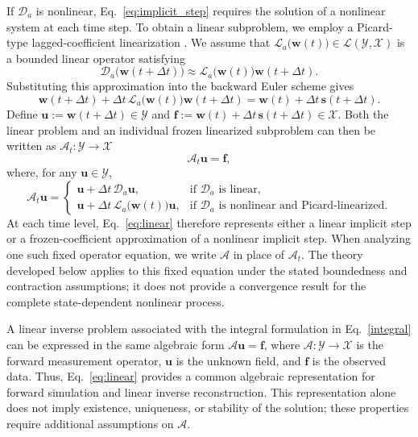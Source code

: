 \documentclass[preprint,numbers,sort&compress]{elsarticle}
\begin{document}
		If $\mathcal D_a$ is nonlinear, Eq.~\eqref{eq:implicit_step} requires the
		solution of a nonlinear system at each time step. To obtain a linear
		subproblem, we employ a Picard-type lagged-coefficient linearization
		\cite{deblois1997linearizing}. We assume that
		$\mathcal L_a\bigl(\boldsymbol w(t)\bigr)
		\in \mathcal L(\mathcal Y,\mathcal X)$ is a bounded linear operator satisfying
		\[
		\mathcal D_a\bigl(\boldsymbol w(t+\Delta t)\bigr)
		\approx
		\mathcal L_a\bigl(\boldsymbol w(t)\bigr)
		\boldsymbol w(t+\Delta t).
		\]
		Substituting this approximation into the backward Euler scheme gives
		\[
		\boldsymbol w(t+\Delta t)
		+
		\Delta t\,
		\mathcal L_a\bigl(\boldsymbol w(t)\bigr)
		\boldsymbol w(t+\Delta t)
		=
		\boldsymbol w(t)
		+
		\Delta t\,\boldsymbol s(t+\Delta t).
		\]
		Define $\boldsymbol u:=
		\boldsymbol w(t+\Delta t)\in\mathcal Y$ and $\boldsymbol f
		:=\boldsymbol w(t)+\Delta t\,\boldsymbol s(t+\Delta t)
		\in\mathcal X$. Both the linear problem and an individual frozen linearized subproblem can then be written as $\mathcal A_t:\mathcal Y\to\mathcal X$
		\begin{equation}
			\label{eq:linear}
			\mathcal A_t\boldsymbol u=\boldsymbol f,
		\end{equation}
		where, for any $\boldsymbol u\in\mathcal Y$,
		\begin{equation}
			\mathcal A_t\boldsymbol u
			=
			\begin{cases}
				\boldsymbol u+\Delta t\,\mathcal D_a\boldsymbol u,
				&
				\text{if $\mathcal D_a$ is linear},
				\\[1mm]
				\boldsymbol u
				+
				\Delta t\,
				\mathcal L_a\bigl(\boldsymbol w(t)\bigr)\boldsymbol u,
				&
				\text{if $\mathcal D_a$ is nonlinear and Picard-linearized}.
			\end{cases}
		\end{equation}
		At each time level, Eq.~\eqref{eq:linear} therefore represents either a linear implicit step or a frozen-coefficient approximation of a nonlinear implicit step. When analyzing one such fixed operator equation, we write $\mathcal A$ in place of $\mathcal A_t$. The theory developed below applies to this fixed equation under the stated boundedness and contraction
		assumptions; it does not provide a convergence result for the complete state-dependent nonlinear process.
		
		A linear inverse problem associated with the integral formulation in Eq.~\eqref{integral} can be expressed in the same algebraic form $\mathcal A\boldsymbol u=\boldsymbol f$, where $\mathcal A:\mathcal Y\to\mathcal X$ is the forward measurement operator, $\boldsymbol u$ is the unknown field, and $\boldsymbol f$ is the
		observed data. Thus, Eq.~\eqref{eq:linear} provides a common algebraic representation for forward simulation and linear inverse reconstruction. This representation alone does not imply existence, uniqueness, or stability of the solution; these properties require additional assumptions on $\mathcal A$.
		
\end{document}
